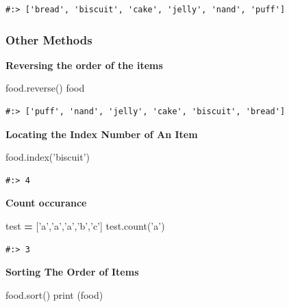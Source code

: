 \documentclass[
]{book}
\newenvironment{Shaded}{\begin{snugshade}}{\end{snugshade}}
\newcommand{\BuiltInTok}[1]{#1}
\newcommand{\NormalTok}[1]{#1}
\newcommand{\OperatorTok}[1]{\textcolor[rgb]{0.43,0.43,0.43}{\textbf{#1}}}
\newcommand{\StringTok}[1]{\textcolor[rgb]{0.5,0.5,0.5}{#1}}
\begin{document}
\begin{verbatim}
#:> ['bread', 'biscuit', 'cake', 'jelly', 'nand', 'puff']
\end{verbatim}

\hypertarget{other-methods}{%
\subsubsection{Other Methods}\label{other-methods}}

\textbf{Reversing the order of the items}

\begin{Shaded}
\begin{Highlighting}[]
\NormalTok{food.reverse()}
\NormalTok{food}
\end{Highlighting}
\end{Shaded}

\begin{verbatim}
#:> ['puff', 'nand', 'jelly', 'cake', 'biscuit', 'bread']
\end{verbatim}

\textbf{Locating the Index Number of An Item}

\begin{Shaded}
\begin{Highlighting}[]
\NormalTok{food.index(}\StringTok{'biscuit'}\NormalTok{)}
\end{Highlighting}
\end{Shaded}

\begin{verbatim}
#:> 4
\end{verbatim}

\textbf{Count occurance}

\begin{Shaded}
\begin{Highlighting}[]
\NormalTok{test }\OperatorTok{=}\NormalTok{ [}\StringTok{'a'}\NormalTok{,}\StringTok{'a'}\NormalTok{,}\StringTok{'a'}\NormalTok{,}\StringTok{'b'}\NormalTok{,}\StringTok{'c'}\NormalTok{]}
\NormalTok{test.count(}\StringTok{'a'}\NormalTok{)}
\end{Highlighting}
\end{Shaded}

\begin{verbatim}
#:> 3
\end{verbatim}

\textbf{Sorting The Order of Items}

\begin{Shaded}
\begin{Highlighting}[]
\NormalTok{food.sort()}
\BuiltInTok{print}\NormalTok{ (food)}
\end{Highlighting}
\end{Shaded}
\end{document}
